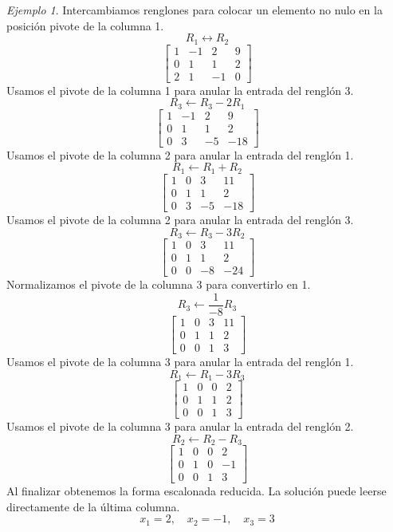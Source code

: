 \documentclass[12pt]{article}
\theoremstyle{remark}
\newtheorem{Ejem}[definicion]{Ejemplo}
\begin{document}
\begin{Ejem}
Intercambiamos renglones para colocar un elemento no nulo en la posición pivote de la columna 1.
\[
R_{1}\leftrightarrow R_{2}
\]
\[
\left[\begin{array}{ccc|c}
1 & -1 & 2 & 9\\
0 & 1 & 1 & 2\\
2 & 1 & -1 & 0
\end{array}\right]
\]
Usamos el pivote de la columna 1 para anular la entrada del renglón 3.
\[
R_{3}\leftarrow R_{3}-2R_{1}
\]
\[
\left[\begin{array}{ccc|c}
1 & -1 & 2 & 9\\
0 & 1 & 1 & 2\\
0 & 3 & -5 & -18
\end{array}\right]
\]
Usamos el pivote de la columna 2 para anular la entrada del renglón 1.
\[
R_{1}\leftarrow R_{1}+R_{2}
\]
\[
\left[\begin{array}{ccc|c}
1 & 0 & 3 & 11\\
0 & 1 & 1 & 2\\
0 & 3 & -5 & -18
\end{array}\right]
\]
Usamos el pivote de la columna 2 para anular la entrada del renglón 3.
\[
R_{3}\leftarrow R_{3}-3R_{2}
\]
\[
\left[\begin{array}{ccc|c}
1 & 0 & 3 & 11\\
0 & 1 & 1 & 2\\
0 & 0 & -8 & -24
\end{array}\right]
\]
Normalizamos el pivote de la columna 3 para convertirlo en 1.
\[
R_{3}\leftarrow \frac{1}{-8}R_{3}
\]
\[
\left[\begin{array}{ccc|c}
1 & 0 & 3 & 11\\
0 & 1 & 1 & 2\\
0 & 0 & 1 & 3
\end{array}\right]
\]
Usamos el pivote de la columna 3 para anular la entrada del renglón 1.
\[
R_{1}\leftarrow R_{1}-3R_{3}
\]
\[
\left[\begin{array}{ccc|c}
1 & 0 & 0 & 2\\
0 & 1 & 1 & 2\\
0 & 0 & 1 & 3
\end{array}\right]
\]
Usamos el pivote de la columna 3 para anular la entrada del renglón 2.
\[
R_{2}\leftarrow R_{2}-R_{3}
\]
\[
\left[\begin{array}{ccc|c}
1 & 0 & 0 & 2\\
0 & 1 & 0 & -1\\
0 & 0 & 1 & 3
\end{array}\right]
\]
Al finalizar obtenemos la forma escalonada reducida. La solución puede leerse directamente de la última columna.
\[
\boxed{x_{1}=2,\quad x_{2}=-1,\quad x_{3}=3}
\]

\end{Ejem}
\end{document}
